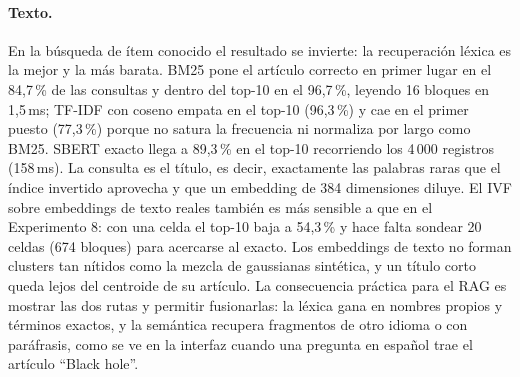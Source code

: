 \paragraph{Texto.} En la búsqueda de ítem conocido el resultado se invierte:
la recuperación léxica es la mejor y la más barata. BM25 pone el artículo correcto en
primer lugar en el 84,7\,\% de las consultas y dentro del top-10 en el 96,7\,\%,
leyendo 16 bloques en 1,5\,ms; TF-IDF con coseno empata en el top-10 (96,3\,\%) y cae
en el primer puesto (77,3\,\%) porque no satura la frecuencia ni normaliza por largo
como BM25. SBERT exacto llega a 89,3\,\% en el top-10 recorriendo los 4\,000 registros
(158\,ms). La consulta es el título, es decir, exactamente las palabras raras que el
índice invertido aprovecha y que un embedding de 384 dimensiones diluye. El IVF sobre
embeddings de texto reales también es más sensible a  que en el
Experimento 8: con una celda el top-10 baja a 54,3\,\% y hace falta sondear 20 celdas
(674 bloques) para acercarse al exacto. Los embeddings de texto no forman clusters tan
nítidos como la mezcla de gaussianas sintética, y un título corto queda lejos del
centroide de su artículo. La consecuencia práctica para el RAG es mostrar las dos
rutas y permitir fusionarlas: la léxica gana en nombres propios y términos exactos, y
la semántica recupera fragmentos de otro idioma o con paráfrasis, como se ve en la
interfaz cuando una pregunta en español trae el artículo ``Black hole''.
